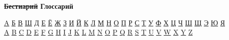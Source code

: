 \begin{flushleft}
    \setlength{\parindent}{14pt}
    \hspace*{10pt}
    \begin{center}
        \textbf{\sout{Бестиарий} Глоссарий}
    \end{center}

\begin{center}
    \hyperlink{1A}{A} \hyperlink{2}{Б} \hyperlink{p}{В} \hyperlink{4}{Ш} \hyperlink{5}{Д} \hyperlink{6}{Е} \hyperlink{7}{Ё} 
\hyperlink{8}{Ж} \hyperlink{9}{З} \hyperlink{10}{И} \hyperlink{11}{Й} \hyperlink{12}{К} \hyperlink{13}{Л} \hyperlink{14}{М}
\hyperlink{15}{Н} \hyperlink{16}{О} \hyperlink{17}{П} \hyperlink{18}{Р} \hyperlink{19}{С} \hyperlink{20}{Т} \hyperlink{21}{У} 
\hyperlink{22}{Ф} \hyperlink{23}{Х} \hyperlink{24}{Ц} \hyperlink{25}{Ч} \hyperlink{26}{Ш} \hyperlink{27}{Щ} \hyperlink{28}{Э}
\hyperlink{29}{Ю} \hyperlink{30}{Я}
\\
\hyperlink{1A}{A} \hyperlink{2B}{B} \hyperlink{33}{C} \hyperlink{44}{D} \hyperlink{55}{E} \hyperlink{66}{F} \hyperlink{77}{G} \hyperlink{88}{H}
\hyperlink{99}{I} \hyperlink{100}{J} \hyperlink{11}{K} \hyperlink{122}{L} \hyperlink{133}{M} \hyperlink{144}{N} \hyperlink{155}{O} \hyperlink{166}{P}
\hyperlink{177}{Q} \hyperlink{188}{R} \hyperlink{199}{S} \hyperlink{200}{T} \hyperlink{211}{U} \hyperlink{222}{V} \hyperlink{233}{W} \hyperlink{244}{X}
\hyperlink{255}{Y} \hyperlink{266}{Z}
\end{center}



\end{flushleft}
